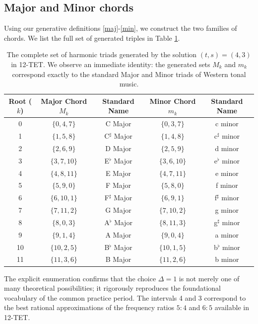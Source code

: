 \documentclass[12pt,letterpaper]{amsart}
\begin{document}
\subsection{Major and Minor chords} 
Using our generative definitions \eqref{maj}-\eqref{min}, we construct the two families of chords. We list the full set of generated triples in Table \ref{tab:delta1}.
 \begin{table}[H]
   \centering
   \scriptsize 
    \renewcommand{\arraystretch}{0.9}
    \begin{tabular}{|c|c|c|c|c|}
        \hline
        \textbf{Root ($k$)} & \textbf{Major Chord $M_k$} & \textbf{Standard Name} & \textbf{Minor Chord $m_k$} & \textbf{Standard Name} \\
        \hline
        0 & $\{0, 4, 7\}$ & C Major & $\{0, 3, 7\}$ & c minor \\
        1 & $\{1, 5, 8\}$ & C$^\sharp$ Major & $\{1, 4, 8\}$ & c$^\sharp$ minor \\
        2 & $\{2, 6, 9\}$ & D Major & $\{2, 5, 9\}$ & d minor \\
        3 & $\{3, 7, 10\}$ & E$^\flat$ Major & $\{3, 6, 10\}$ & e$^\flat$ minor \\
        4 & $\{4, 8, 11\}$ & E Major & $\{4, 7, 11\}$ & e minor \\
        5 & $\{5, 9, 0\}$ & F Major & $\{5, 8, 0\}$ & f minor \\
        6 & $\{6, 10, 1\}$ & F$^\sharp$ Major & $\{6, 9, 1\}$ & f$^\sharp$ minor \\
        7 & $\{7, 11, 2\}$ & G Major & $\{7, 10, 2\}$ & g minor \\
        8 & $\{8, 0, 3\}$ & A$^\flat$ Major & $\{8, 11, 3\}$ & g$^\sharp$ minor \\
        9 & $\{9, 1, 4\}$ & A Major & $\{9, 0, 4\}$ & a minor \\
        10 & $\{10, 2, 5\}$ & B$^\flat$ Major & $\{10, 1, 5\}$ & b$^\flat$ minor \\
        11 & $\{11, 3, 6\}$ & B Major & $\{11, 2, 6\}$ & b minor \\
        \hline
    \end{tabular}
    \caption{\scriptsize The complete set of harmonic triads generated by the solution $(t,s)=(4,3)$ in 12-TET. We observe an immediate identity: the generated sets $M_k$ and $m_k$ correspond exactly to the standard Major and Minor triads of Western tonal music.}
    \label{tab:delta1}
\end{table}

The explicit enumeration confirms that the choice $\Delta=1$ is not merely one of many theoretical possibilities; it rigorously reproduces the foundational vocabulary of the common practice period. The intervals 4 and 3 correspond to the best rational approximations of the frequency ratios $5:4$ and $6:5$ available in 12-TET.
\end{document}
